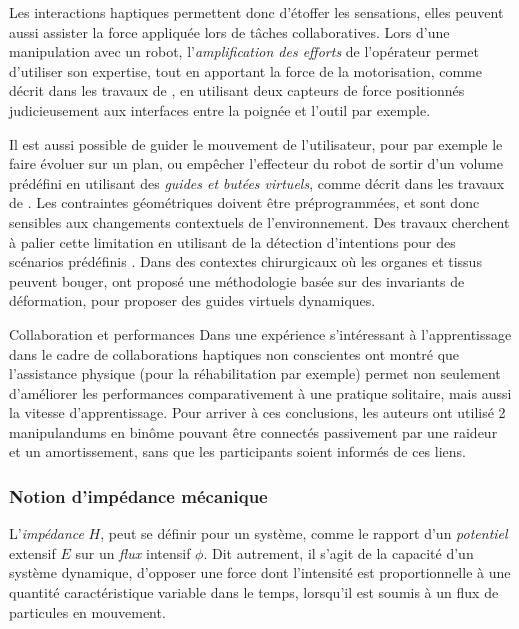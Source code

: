Les interactions haptiques permettent donc d'étoffer les sensations, elles peuvent aussi assister la force appliquée lors de tâches collaboratives. Lors d'une manipulation avec un robot, l'\emph{amplification des efforts} de l'opérateur permet d'utiliser son expertise, tout en apportant la force de la motorisation, comme décrit dans les travaux de \textcite{cagneau_passive_2008, lamy_human_2010}, en utilisant deux capteurs de force positionnés judicieusement aux interfaces entre la poignée et l'outil par exemple.

Il est aussi possible de guider le mouvement de l'utilisateur, pour par exemple le faire évoluer sur un plan, ou empêcher l'effecteur du robot de sortir d'un volume prédéfini en utilisant des \emph{guides et butées virtuels}, comme décrit dans les travaux de \textcite{restrepo_iterative_2017}. Les contraintes géométriques doivent être préprogrammées, et sont donc sensibles aux changements contextuels de l'environnement. Des travaux cherchent à palier cette limitation en utilisant de la détection d'intentions pour des scénarios prédéfinis \parencite{bu_online_2016}. Dans des contextes chirurgicaux où les organes et tissus peuvent bouger, \textcite{bowyer_deformation_2014} ont proposé une méthodologie basée sur des invariants de déformation, pour proposer des guides virtuels dynamiques.

\begin{aside}{Collaboration et performances}
	Dans une expérience s'intéressant à l'apprentissage dans le cadre de collaborations haptiques non conscientes \parencite{ganesh_two_2014} ont montré que l'assistance physique (pour la réhabilitation par exemple) permet non seulement d'améliorer les performances comparativement à une pratique solitaire, mais aussi la vitesse d'apprentissage. Pour arriver à ces conclusions, les auteurs ont utilisé 2 manipulandums en binôme pouvant être connectés passivement par une raideur et un amortissement, sans que les participants soient informés de ces liens.
\end{aside}

\subsubsection{Notion d'impédance mécanique} \label{chap1_sec_rob_collab_subsec_2_4}


L'\emph{impédance} $H$, peut se définir pour un système, comme le rapport d'un \emph{potentiel} extensif $E$ sur un \emph{flux} intensif $\phi$. Dit autrement, il s'agit de la capacité d'un système dynamique, d'opposer une force dont l'intensité est proportionnelle à une quantité caractéristique variable dans le temps, lorsqu'il est soumis à un flux de particules en mouvement.

